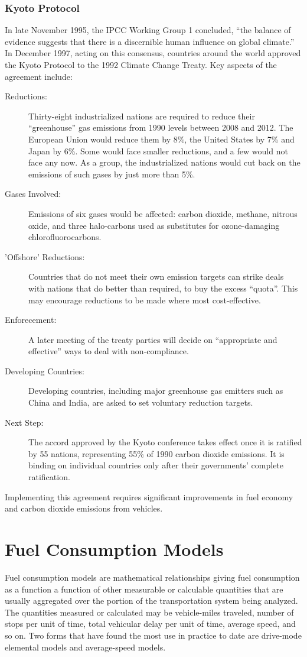 \subsubsection{Kyoto Protocol}
In late November 1995, the IPCC Working Group 1 concluded, “the balance of evidence suggests that there is a discernible human influence on global climate.” In December 1997, acting on this consensus, countries around the world approved the Kyoto Protocol to the 1992 Climate Change Treaty. Key aspects of the agreement include:
\begin{description}
	\item [Reductions:] Thirty-eight industrialized nations are required to reduce their “greenhouse” gas emissions from 1990 levels between 2008 and 2012. The European Union would reduce them by 8\%, the United States by 7\% and Japan by 6\%. Some would face smaller reductions, and a few would not face any now. As a group, the industrialized nations would cut back on the emissions of such gases by just more than 5\%.
	\item [Gases Involved:] Emissions of six gases would be affected: carbon dioxide, methane, nitrous oxide, and three halo-carbons used as substitutes for ozone-damaging chlorofluorocarbons.
	\item ['Offshore' Reductions:] Countries that do not meet their own emission targets can strike deals with nations that do better than required, to buy the excess “quota”. This may encourage reductions to be made where most cost-effective.
	\item [Enforecement:] A later meeting of the treaty parties will decide on “appropriate and effective” ways to deal with non-compliance.
	\item [Developing Countries:] Developing countries, including major greenhouse gas emitters such as China and India, are asked to set voluntary reduction targets.
	\item [Next Step:] The accord approved by the Kyoto conference takes effect once it is ratified by 55 nations, representing 55\% of 1990 carbon dioxide emissions. It is binding on individual countries only after their governments' complete ratification.
\end{description}
Implementing this agreement requires significant improvements in fuel economy and carbon dioxide emissions from vehicles.
%
\section{Fuel Consumption Models}
Fuel consumption models are mathematical relationships giving fuel consumption as a function a function of other measurable or calculable quantities that are usually aggregated over the portion of the transportation system being analyzed. The quantities measured or calculated may be vehicle-miles traveled, number of stops per unit of time, total vehicular delay per unit of time, average speed, and so on. Two forms that have found the most use in practice to date are drive-mode elemental models and average-speed models.
